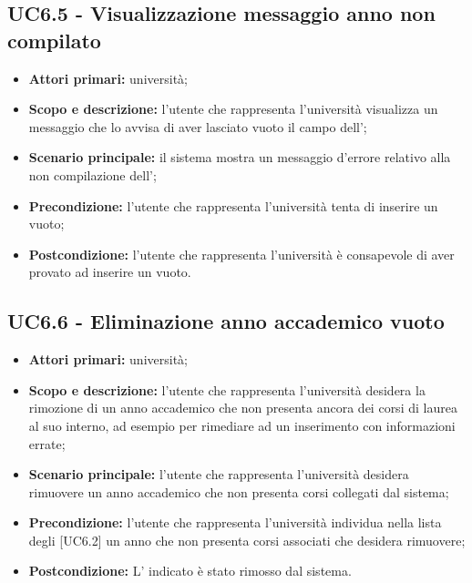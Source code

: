 \documentclass[AnalisiDeiRequisiti.tex]{subfiles}
\begin{document}
\subsection{UC6.5 - Visualizzazione messaggio anno non compilato}
\begin{itemize}
	\item \textbf{Attori primari:} università;
	\item \textbf{Scopo e descrizione:} l'utente che rappresenta l'università visualizza un messaggio che lo avvisa di aver lasciato vuoto il campo dell';
	\item \textbf{Scenario principale:} il sistema mostra un messaggio d'errore relativo alla non compilazione dell';
	\item \textbf{Precondizione:} l'utente che rappresenta l'università tenta di inserire un  vuoto; 
	\item \textbf{Postcondizione:} l'utente che rappresenta l'università è consapevole di aver provato ad inserire un  vuoto.
\end{itemize}
\subsection{UC6.6 - Eliminazione anno accademico vuoto}
\begin{itemize}
\item \textbf{Attori primari:} università;
\item \textbf{Scopo e descrizione:} l'utente che rappresenta l'università desidera la rimozione di un anno accademico che non presenta ancora dei corsi di laurea al suo interno, ad esempio per rimediare ad un inserimento con informazioni errate;
\item \textbf{Scenario principale:} l'utente che rappresenta l'università desidera rimuovere un anno accademico che non presenta corsi collegati dal sistema;
\item \textbf{Precondizione:} l'utente che rappresenta l'università individua nella lista degli  [UC6.2] un anno che non presenta corsi associati che desidera rimuovere; 
\item \textbf{Postcondizione:} L' indicato è stato rimosso dal sistema.
\end{itemize}
\end{document}
